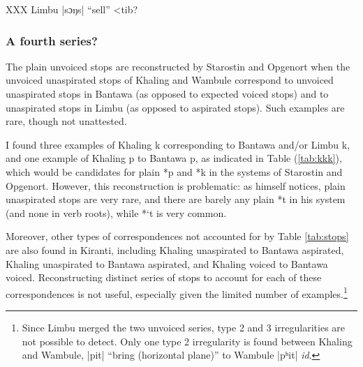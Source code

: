 \documentclass[oldfontcommands,oneside,a4paper,11pt]{article}
\newcommand{\ipa}[1]{{\phon\mbox{#1}}} %
\newcommand{\dhatu}[2]{|\ipa{#1}| ``#2''}
\begin{document}
XXX Limbu \dhatu{sɔŋs}{sell} <tib?

\subsubsection{A fourth series?} \label{sec:fourth}
The plain unvoiced stops are reconstructed by Starostin and Opgenort  when the unvoiced unaspirated stops of Khaling and Wambule correspond to unvoiced unaspirated stops in Bantawa (as opposed to expected voiced stops) and to unaspirated stops in Limbu (as opposed to aspirated stops). Such examples are rare, though not unattested. 

I found three examples of Khaling \ipa{k} corresponding to Bantawa and/or Limbu \ipa{k}, and one example of Khaling \ipa{p} to Bantawa \ipa{p}, as indicated in Table (\ref{tab:kkk}), which would be candidates for plain *\ipa{p} and *\ipa{k} in the systems of Starostin and Opgenort. However, this reconstruction is problematic: as \citet[17]{opgenort05jero} himself notices, plain unaspirated stops are very rare, and there are barely any plain *\ipa{t} in his system (and none in verb roots), while *\ipa{`t} is very common.  


Moreover, other types of correspondences not accounted for by Table \ref{tab:stops} are also found in Kiranti, including Khaling  unaspirated to Bantawa aspirated, Khaling unaspirated to Bantawa aspirated, and Khaling voiced to Bantawa voiced. Reconstructing distinct series of stops to account for each of these correspondences is not useful, especially given the limited number of examples.\footnote{Since Limbu merged the two unvoiced series, type 2 and 3 irregularities are not possible to detect. Only one type 2 irregularity is found between Khaling and Wambule, \dhatu{pit}{bring (horizontal plane)} to Wambule |\ipa{pʰit}| \textit{id}.}
\end{document}
